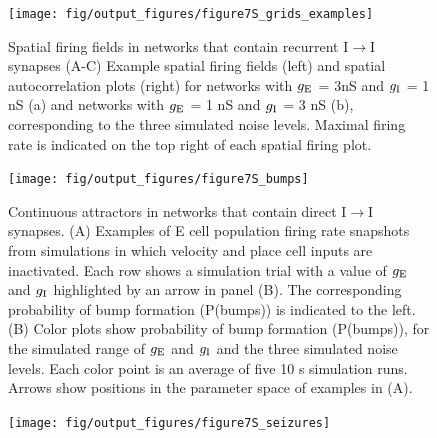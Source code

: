 \documentclass[a4paper,12pt]{article}
\newcommand{\ssc}[3]{\ensuremath{#1_{\text{#2}_{\text{#3}}}}}
\newcommand{\gE      }{\ssc{g}      {\scriptsize{E}}{}}
\newcommand{\gI      }{\ssc{g}      {\scriptsize{I}}{}}
\begin{document}
\setcounter{figure}{0}
\renewcommand{\figurename}{Figure 7 - figure supplement}


\begin{figure}[p]
    \internallinenumbers
    \centering
        \texttt{[image: fig/output\_figures/figure7S\_grids\_examples]}
    \caption{Spatial firing fields in networks that contain recurrent
    I$\rightarrow$I synapses (A-C) Example spatial firing fields (left) and spatial
    autocorrelation plots (right) for networks with $\gE$ = 3nS and $\gI$ = 1
    nS (a) and networks with $\gE$ = 1 nS and $\gI$ = 3 nS (b), corresponding
    to the three simulated noise levels. Maximal firing rate is indicated on
    the top right of each spatial firing plot.
    }
\end{figure}

\clearpage

\begin{figure}[p]
    \internallinenumbers
    \centering
        \texttt{[image: fig/output\_figures/figure7S\_bumps]}
    \caption{Continuous attractors in networks that contain direct
    I$\rightarrow$I synapses. (A) Examples of E cell population firing rate
    snapshots from simulations in which velocity and place cell inputs are
    inactivated. Each row shows a simulation trial with a value of $\gE$ and
    $\gI$
    highlighted by an arrow in panel (B). The corresponding probability of bump
    formation (P(bumps)) is indicated to the left.  (B) Color plots show
    probability of bump formation (P(bumps)), for the simulated range of $\gE$ and
    $\gI$ and the three simulated noise levels. Each color point is an average of
    five 10 s simulation runs. Arrows show positions in the parameter space of
    examples in (A).}
\end{figure}

\clearpage

\begin{figure}[p]
    \internallinenumbers
    \centering
        \texttt{[image: fig/output\_figures/figure7S\_seizures]}
\end{figure}

\clearpage
\end{document}
